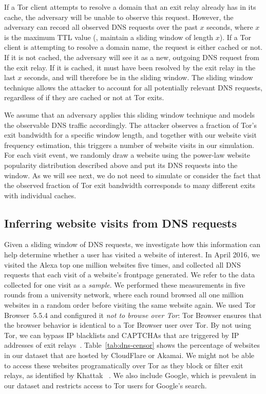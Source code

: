 If a Tor client attempts to resolve a domain that an exit relay already has in
its cache, the adversary will be unable to observe this request.  However, the
adversary can record all observed DNS requests over the past $x$
seconds, where $x$ is the maximum TTL value (\ie, maintain a sliding window of
length $x$).  If a Tor client
is attempting to resolve a domain name, the request is either cached or not.  If
it is not cached, the adversary will see it as a new, outgoing DNS request from
the exit relay. If it is cached, it must have been resolved by the exit relay in
the last $x$ seconds, and will therefore be in the sliding window.  The sliding
window technique allows the attacker to account for all potentially relevant
DNS requests, regardless of if they are cached or not at Tor exits.

We assume that an adversary applies this sliding window technique and models the
observable DNS traffic accordingly.  The attacker observes a fraction of Tor's exit
bandwidth for a specific window length, and together with our website visit
frequency estimation, this triggers a number of website visits in our
simulation.  For each visit event, we randomly draw a website using the
power-law website popularity distribution described above and put its DNS
requests into the window. As we will see next, we do not need to simulate or
consider the fact that the observed fraction of Tor exit bandwidth corresponds
to many different exits with individual caches.

\subsection{Inferring website visits from DNS requests}
\label{sec:dns2site}

Given a sliding window of DNS requests, we investigate how this information can
help determine whether a user has visited a website of interest.  In April 2016,
we visited the Alexa top one million websites five times, and collected all DNS
requests that each visit of a website's frontpage generated.  We refer to the
data collected for one visit as a \emph{sample}.  We performed these
measurements in five rounds from a university network, where each round browsed
all one million websites in a random order before visiting the same website
again. We used Tor Browser~5.5.4 and configured it {\em not to browse over Tor}:
Tor Browser ensures that the browser behavior is identical to a Tor Browser user
over Tor. By not using Tor, we can bypass IP blacklists and CAPTCHAs that are
triggered by IP addresses of exit relays~\cite{Khattak2016a}.
Table~\ref{tab:dns-censor} shows the percentage of websites in our dataset that
are hosted by CloudFlare or Akamai.  We might not be able to access these
websites programatically over Tor as they block or filter exit relays, as
identified by Khattak \ea~\cite{Khattak2016a}. We also include Google, which is
prevalent in our dataset and restricts access to Tor users for Google's search.

